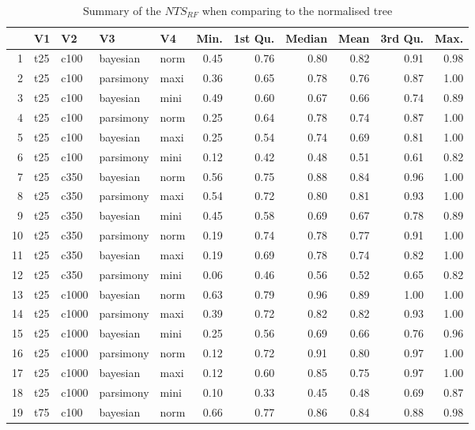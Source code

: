 \documentclass[12pt,letterpaper]{article}
\begin{document}
\begin{longtable}{rllllrrrrrr}
\caption{Summary of the $NTS_{RF}$ when comparing to the normalised tree}\\

  \hline
 & V1 & V2 & V3 & V4 & Min. & 1st Qu. & Median & Mean & 3rd Qu. & Max. \\ 
  \hline
1 & t25 & c100 & bayesian & norm & 0.45 & 0.76 & 0.80 & 0.82 & 0.91 & 0.98 \\ 
  2 & t25 & c100 & parsimony & maxi & 0.36 & 0.65 & 0.78 & 0.76 & 0.87 & 1.00 \\ 
  3 & t25 & c100 & bayesian & mini & 0.49 & 0.60 & 0.67 & 0.66 & 0.74 & 0.89 \\ 
  4 & t25 & c100 & parsimony & norm & 0.25 & 0.64 & 0.78 & 0.74 & 0.87 & 1.00 \\ 
  5 & t25 & c100 & bayesian & maxi & 0.25 & 0.54 & 0.74 & 0.69 & 0.81 & 1.00 \\ 
  6 & t25 & c100 & parsimony & mini & 0.12 & 0.42 & 0.48 & 0.51 & 0.61 & 0.82 \\ 
  7 & t25 & c350 & bayesian & norm & 0.56 & 0.75 & 0.88 & 0.84 & 0.96 & 1.00 \\ 
  8 & t25 & c350 & parsimony & maxi & 0.54 & 0.72 & 0.80 & 0.81 & 0.93 & 1.00 \\ 
  9 & t25 & c350 & bayesian & mini & 0.45 & 0.58 & 0.69 & 0.67 & 0.78 & 0.89 \\ 
  10 & t25 & c350 & parsimony & norm & 0.19 & 0.74 & 0.78 & 0.77 & 0.91 & 1.00 \\ 
  11 & t25 & c350 & bayesian & maxi & 0.19 & 0.69 & 0.78 & 0.74 & 0.82 & 1.00 \\ 
  12 & t25 & c350 & parsimony & mini & 0.06 & 0.46 & 0.56 & 0.52 & 0.65 & 0.82 \\ 
  13 & t25 & c1000 & bayesian & norm & 0.63 & 0.79 & 0.96 & 0.89 & 1.00 & 1.00 \\ 
  14 & t25 & c1000 & parsimony & maxi & 0.39 & 0.72 & 0.82 & 0.82 & 0.93 & 1.00 \\ 
  15 & t25 & c1000 & bayesian & mini & 0.25 & 0.56 & 0.69 & 0.66 & 0.76 & 0.96 \\ 
  16 & t25 & c1000 & parsimony & norm & 0.12 & 0.72 & 0.91 & 0.80 & 0.97 & 1.00 \\ 
  17 & t25 & c1000 & bayesian & maxi & 0.12 & 0.60 & 0.85 & 0.75 & 0.97 & 1.00 \\ 
  18 & t25 & c1000 & parsimony & mini & 0.10 & 0.33 & 0.45 & 0.48 & 0.69 & 0.87 \\ 
  19 & t75 & c100 & bayesian & norm & 0.66 & 0.77 & 0.86 & 0.84 & 0.88 & 0.98 \\ 

\end{longtable}
\end{document}
